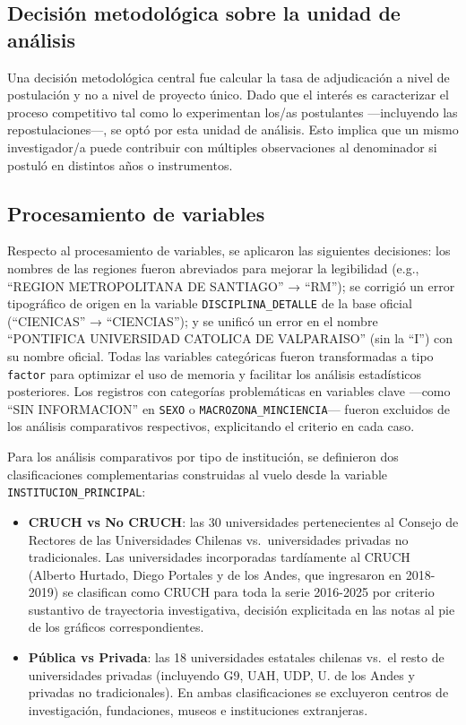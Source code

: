 \documentclass[
  spanish,
  a4paper,
  oneside]{scrbook}
\begin{document}
\subsection{Decisión metodológica sobre la unidad de
análisis}\label{decisiuxf3n-metodoluxf3gica-sobre-la-unidad-de-anuxe1lisis}

Una decisión metodológica central fue calcular la tasa de adjudicación a
nivel de postulación y no a nivel de proyecto único. Dado que el interés
es caracterizar el proceso competitivo tal como lo experimentan los/as
postulantes ---incluyendo las repostulaciones---, se optó por esta
unidad de análisis. Esto implica que un mismo investigador/a puede
contribuir con múltiples observaciones al denominador si postuló en
distintos años o instrumentos.

\subsection{Procesamiento de
variables}\label{procesamiento-de-variables}

Respecto al procesamiento de variables, se aplicaron las siguientes
decisiones: los nombres de las regiones fueron abreviados para mejorar
la legibilidad (e.g., ``REGION METROPOLITANA DE SANTIAGO'' → ``RM''); se
corrigió un error tipográfico de origen en la variable
\texttt{DISCIPLINA\_DETALLE} de la base oficial (``CIENICAS'' →
``CIENCIAS''); y se unificó un error en el nombre ``PONTIFICA
UNIVERSIDAD CATOLICA DE VALPARAISO'' (sin la ``I'') con su nombre
oficial. Todas las variables categóricas fueron transformadas a tipo
\texttt{factor} para optimizar el uso de memoria y facilitar los
análisis estadísticos posteriores. Los registros con categorías
problemáticas en variables clave ---como ``SIN INFORMACION'' en
\texttt{SEXO} o \texttt{MACROZONA\_MINCIENCIA}--- fueron excluidos de
los análisis comparativos respectivos, explicitando el criterio en cada
caso.

Para los análisis comparativos por tipo de institución, se definieron
dos clasificaciones complementarias construidas al vuelo desde la
variable \texttt{INSTITUCION\_PRINCIPAL}:

\begin{itemize}
\item
  \textbf{CRUCH vs No CRUCH}: las 30 universidades pertenecientes al
  Consejo de Rectores de las Universidades Chilenas vs.~universidades
  privadas no tradicionales. Las universidades incorporadas tardíamente
  al CRUCH (Alberto Hurtado, Diego Portales y de los Andes, que
  ingresaron en 2018-2019) se clasifican como CRUCH para toda la serie
  2016-2025 por criterio sustantivo de trayectoria investigativa,
  decisión explicitada en las notas al pie de los gráficos
  correspondientes.
\item
  \textbf{Pública vs Privada}: las 18 universidades estatales chilenas
  vs.~el resto de universidades privadas (incluyendo G9, UAH, UDP, U. de
  los Andes y privadas no tradicionales). En ambas clasificaciones se
  excluyeron centros de investigación, fundaciones, museos e
  instituciones extranjeras.
\end{itemize}
\end{document}

